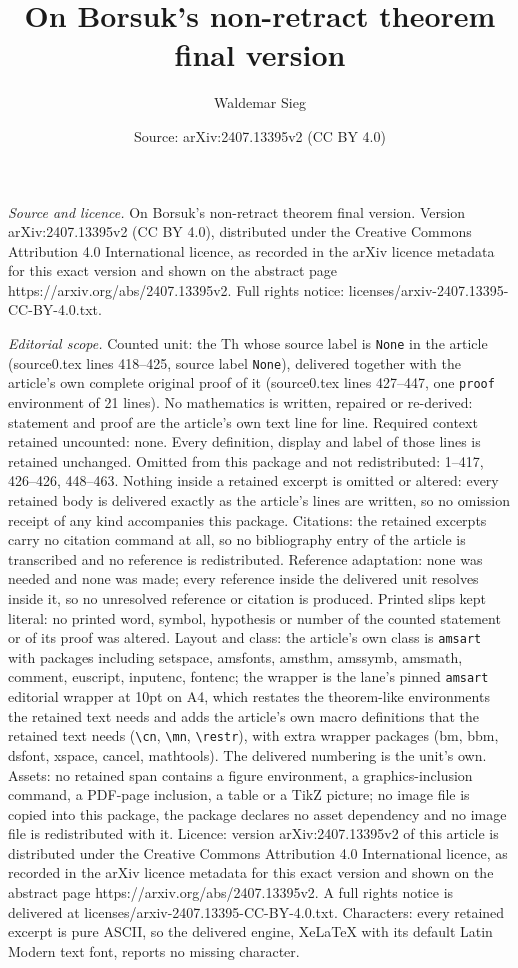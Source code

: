 \documentclass[10pt,a4paper]{amsart}
\title[On Borsuk's non-retract theorem final version]{On Borsuk's non-retract theorem final version}
\author{Waldemar Sieg}
\date{Source: arXiv:2407.13395v2 (CC BY 4.0)}
\begin{document}
\maketitle

\noindent\emph{Source and licence.} On Borsuk's non-retract theorem final version. Version arXiv:2407.13395v2 (CC BY 4.0), distributed under the Creative Commons Attribution 4.0 International licence, as recorded in the arXiv licence metadata for this exact version and shown on the abstract page https://arxiv.org/abs/2407.13395v2. Full rights notice: licenses/arxiv-2407.13395-CC-BY-4.0.txt.\par\smallskip

\noindent\textit{Editorial scope.} Counted unit: the Th whose source label is \texttt{None} in the article (source0.tex lines 418--425, source label \texttt{None}), delivered together with the article's own complete original proof of it (source0.tex lines 427--447, one \texttt{proof} environment of 21 lines). No mathematics is written, repaired or re-derived: statement and proof are the article's own text line for line. Required context retained uncounted: none. Every definition, display and label of those lines is retained unchanged. Omitted from this package and not redistributed: 1--417, 426--426, 448--463. Nothing inside a retained excerpt is omitted or altered: every retained body is delivered exactly as the article's lines are written, so no omission receipt of any kind accompanies this package. Citations: the retained excerpts carry no citation command at all, so no bibliography entry of the article is transcribed and no reference is redistributed. Reference adaptation: none was needed and none was made; every reference inside the delivered unit resolves inside it, so no unresolved reference or citation is produced. Printed slips kept literal: no printed word, symbol, hypothesis or number of the counted statement or of its proof was altered. Layout and class: the article's own class is \texttt{amsart} with packages including setspace, amsfonts, amsthm, amssymb, amsmath, comment, euscript, inputenc, fontenc; the wrapper is the lane's pinned \texttt{amsart} editorial wrapper at 10pt on A4, which restates the theorem-like environments the retained text needs and adds the article's own macro definitions that the retained text needs (\texttt{\textbackslash cn}, \texttt{\textbackslash mn}, \texttt{\textbackslash restr}), with extra wrapper packages (bm, bbm, dsfont, xspace, cancel, mathtools). The delivered numbering is the unit's own. Assets: no retained span contains a figure environment, a graphics-inclusion command, a PDF-page inclusion, a table or a TikZ picture; no image file is copied into this package, the package declares no asset dependency and no image file is redistributed with it. Licence: version arXiv:2407.13395v2 of this article is distributed under the Creative Commons Attribution 4.0 International licence, as recorded in the arXiv licence metadata for this exact version and shown on the abstract page https://arxiv.org/abs/2407.13395v2. A full rights notice is delivered at licenses/arxiv-2407.13395-CC-BY-4.0.txt. Characters: every retained excerpt is pure ASCII, so the delivered engine, XeLaTeX with its default Latin Modern text font, reports no missing character.
\end{document}
